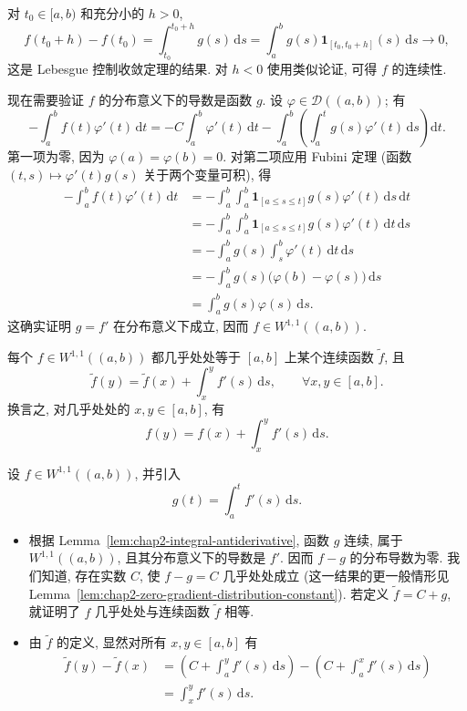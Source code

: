 \begin{Proof}
对 $t_0\in[a,b)$ 和充分小的 $h>0$,
\[
 f(t_0+h)-f(t_0)
 =\int_{t_0}^{t_0+h}g(s)\,\mathrm{d}s
 =\int_a^b g(s)\mathbf{1}_{[t_0,t_0+h]}(s)\,\mathrm{d}s
 \longrightarrow0,
\]
这是 Lebesgue 控制收敛定理的结果. 对 $h<0$ 使用类似论证, 可得 $f$ 的连续性.

现在需要验证 $f$ 的分布意义下的导数是函数 $g$. 设 $\varphi\in\mathcal{D}((a,b))$; 有
\[
 -\int_a^b f(t)\varphi'(t)\,\mathrm{d}t
 =-C\int_a^b\varphi'(t)\,\mathrm{d}t
 -\int_a^b\left(\int_a^t g(s)\varphi'(t)\,\mathrm{d}s\right)\mathrm{d}t.
\]
第一项为零, 因为 $\varphi(a)=\varphi(b)=0$. 对第二项应用 Fubini 定理 (函数 $(t,s)\mapsto\varphi'(t)g(s)$ 关于两个变量可积), 得
\begin{align*}
 -\int_a^b f(t)\varphi'(t)\,\mathrm{d}t
 &=-\int_a^b\int_a^b\mathbf{1}_{[a\leq s\leq t]}g(s)\varphi'(t)\,\mathrm{d}s\,\mathrm{d}t\\
 &=-\int_a^b\int_a^b\mathbf{1}_{[a\leq s\leq t]}g(s)\varphi'(t)\,\mathrm{d}t\,\mathrm{d}s\\
 &=-\int_a^b g(s)\int_s^b\varphi'(t)\,\mathrm{d}t\,\mathrm{d}s\\
 &=-\int_a^b g(s)\bigl(\varphi(b)-\varphi(s)\bigr)\,\mathrm{d}s\\
 &=\int_a^b g(s)\varphi(s)\,\mathrm{d}s.
\end{align*}
这确实证明 $g=f'$ 在分布意义下成立, 因而 $f\in W^{1,1}((a,b))$.
\end{Proof}

\begin{Corollary}
\label{cor:chap2-w11-continuous-representative}
每个 $f\in W^{1,1}((a,b))$ 都几乎处处等于 $[a,b]$ 上某个连续函数 $\widetilde f$, 且
\[
 \widetilde f(y)=\widetilde f(x)+\int_x^y f'(s)\,\mathrm{d}s,
 \qquad\forall x,y\in[a,b].
\]
换言之, 对几乎处处的 $x,y\in[a,b]$, 有
\[
 f(y)=f(x)+\int_x^y f'(s)\,\mathrm{d}s.
\]
\end{Corollary}

\begin{Proof}
设 $f\in W^{1,1}((a,b))$, 并引入
\[
 g(t)=\int_a^t f'(s)\,\mathrm{d}s.
\]
\begin{itemize}
\item 根据 Lemma~\ref{lem:chap2-integral-antiderivative}, 函数 $g$ 连续, 属于 $W^{1,1}((a,b))$, 且其分布意义下的导数是 $f'$. 因而 $f-g$ 的分布导数为零. 我们知道, 存在实数 $C$, 使 $f-g=C$ 几乎处处成立 (这一结果的更一般情形见 Lemma~\ref{lem:chap2-zero-gradient-distribution-constant}). 若定义 $\widetilde f=C+g$, 就证明了 $f$ 几乎处处与连续函数 $\widetilde f$ 相等.
\item 由 $\widetilde f$ 的定义, 显然对所有 $x,y\in[a,b]$ 有
\begin{align*}
 \widetilde f(y)-\widetilde f(x)
 &=\left(C+\int_a^y f'(s)\,\mathrm{d}s\right)
 -\left(C+\int_a^x f'(s)\,\mathrm{d}s\right)\\
 &=\int_x^y f'(s)\,\mathrm{d}s.
\end{align*}
\end{itemize}
\end{Proof}

